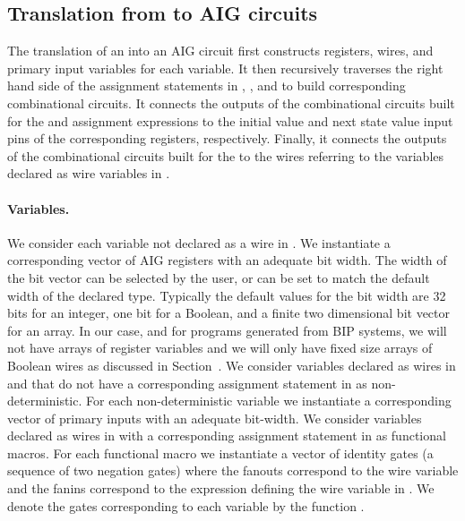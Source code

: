 
\subsection{Translation from \caig to AIG circuits }

The translation of an \caig into an AIG circuit
first constructs registers, wires, and primary input variables for each 
\caig variable. 
%
It then recursively traverses the right hand side 
of the assignment statements in , ,
and  to build corresponding combinational circuits.
%
It connects the outputs of the combinational 
circuits built for the  and  
assignment expressions to the 
initial value and next state value input pins of the corresponding 
registers, respectively. 
%
Finally, it connects the outputs of the combinational circuits built 
for the   to the wires referring to the 
variables declared as wire variables in .

\paragraph{Variables.} 
%
We consider each variable not declared as a wire in .
We instantiate a corresponding 
vector of AIG registers with an adequate bit width. 
The width of the bit vector can be selected by the user, 
or can be set to match the default width of the declared type. 
Typically the default values for the bit width are 
32 bits for an integer, one bit for a Boolean, and a 
finite two dimensional bit vector for an array. 
In our case, and for \caig programs generated from BIP systems, 
we will not have arrays of register variables
and we will only have fixed size arrays of Boolean wires as 
discussed in Section~\label{s:bip2caig}.
%
We consider variables declared as wires in 
and that do not have a corresponding assignment statement 
in  as non-deterministic. 
For each non-deterministic variable we instantiate a corresponding
vector of primary inputs with an adequate bit-width. 
%
We consider variables declared as wires in  with 
a corresponding assignment statement in  as functional macros. 
For each functional macro we 
instantiate a vector of identity gates (a sequence of two negation gates) 
where the fanouts correspond to the wire variable and the fanins correspond to
the expression defining the wire variable in . 
%
We denote the gates corresponding to each variable by the function . 

